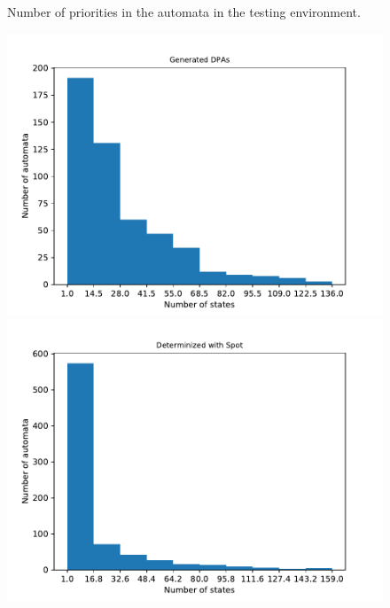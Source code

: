 \begin{figure}
\begin{minipage}{0.49\textwidth}
		\caption{Number of priorities in the automata in the testing environment.}
		\label{exp:fig:rawstats_prios}
	\end{minipage}
\end{figure}

\begin{figure}
	\centering
	\begin{minipage}{0.49\textwidth}
		\includegraphics[page=1,height=.3\textheight]{../data/analysis/rawstats_gendet.pdf} 
		\includegraphics[page=1,height=.3\textheight]{../data/analysis/rawstats_detspot.pdf} 

\end{minipage}
\end{figure}
